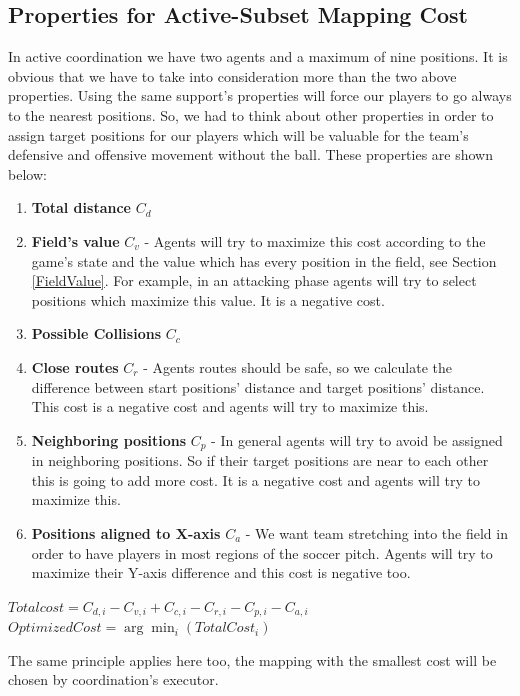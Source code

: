 \subsection{Properties for Active-Subset Mapping Cost}
In active coordination we have two agents and a maximum of nine positions. It is obvious that we have to take into consideration more than the two above properties. Using the same support's properties will force our players to go always to the nearest positions. So, we had to think about other properties in order to assign target positions for our players which will be valuable for the team's defensive and offensive movement without the ball. These properties are shown below:
\begin{enumerate}
\item \textbf{Total distance }$C_{d}$
\item \textbf{Field's value }$C_{v}$ - Agents will try to maximize this cost according to the game's state and the value which has every position in the field, see Section \ref{FieldValue}. For example, in an attacking phase agents will try to select positions which maximize this value. It is a negative cost.
\item \textbf{Possible Collisions }$C_{c}$
\item \textbf{Close routes }$C_{r}$ - Agents routes should be safe, so we calculate the difference between start positions' distance and target positions' distance. This cost is a negative cost and agents will try to maximize this.
\item \textbf{Neighboring positions }$C_{p}$ - In general agents will try to avoid be assigned in neighboring positions. So if their target positions are near to each other this is going to add more cost. It is a negative cost and agents will try to maximize this.
\item \textbf{Positions aligned to X-axis }$C_{a}$ - We want team stretching into the field in order to have players in most regions of the soccer pitch. Agents will try to maximize their Y-axis difference and this cost is negative too. 
\end{enumerate}
\begin{center}
$Total cost = C_{d,i}-C_{v,i}+C_{c,i}-C_{r,i}-C_{p,i}-C_{a,i}$\\
$Optimized Cost = \arg\min_{i}(TotalCost_{i})$
\end{center}
The same principle applies here too, the mapping with the smallest cost will be chosen by coordination's executor.